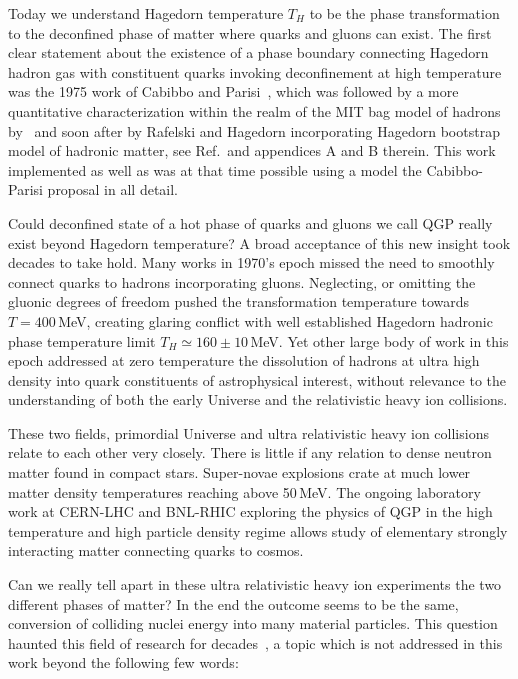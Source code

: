 {Today we understand Hagedorn temperature $T_H$ to be the phase transformation to the deconfined phase of matter where quarks and gluons can exist. The first clear statement about the existence of a phase boundary connecting Hagedorn hadron gas with constituent quarks invoking deconfinement at high temperature was the 1975 work of Cabibbo and Parisi~\cite{Cabibbo:1975ig}, which was followed by a more quantitative characterization within the realm of the MIT bag model of hadrons by~\cite{Chin:1978gj} and soon after by Rafelski and Hagedorn incorporating Hagedorn bootstrap model of hadronic matter, see Ref.\,\cite{Rafelski:2015cxa} and appendices A and B therein. This work implemented as well as was at that time possible using a model the Cabibbo-Parisi proposal in all detail.

Could deconfined state of a hot phase of quarks and gluons we call QGP really exist beyond Hagedorn temperature? A broad acceptance of this new insight took decades to take hold. Many works in 1970's epoch missed the need to smoothly connect quarks to hadrons incorporating gluons. Neglecting, or omitting the gluonic degrees of freedom pushed the transformation temperature towards $T=400$\,MeV, creating glaring conflict with well established Hagedorn hadronic phase temperature limit $T_H\simeq 160\pm 10$\,MeV. Yet other large body of work in this epoch addressed at zero temperature the dissolution of hadrons at ultra high density into quark constituents of astrophysical interest, without relevance to the understanding of both the early Universe and the relativistic heavy ion collisions.

These two fields, primordial Universe and ultra relativistic heavy ion collisions relate to each other very closely. There is little if any relation to dense neutron matter found in compact stars. Super-novae explosions crate at much lower matter density temperatures reaching above 50\,MeV. The ongoing laboratory work at CERN-LHC and BNL-RHIC exploring the physics of QGP in the high temperature and high particle density regime allows study of elementary strongly interacting matter  connecting quarks to cosmos.
 
Can we really tell apart in these ultra relativistic heavy ion experiments the  two different phases of matter? In the end the outcome seems to be the same, conversion of colliding nuclei energy into many material particles. This question haunted this field of research for decades~\cite{Rafelski:2015cxa,Harris:2024aov}, a topic which is not addressed in this work beyond the following few words: 

}
